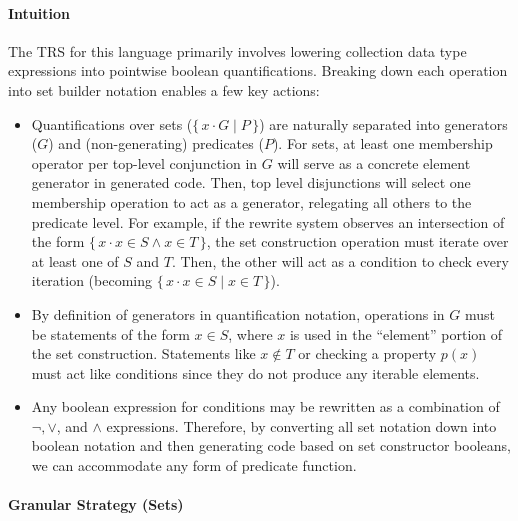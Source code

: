 \documentclass{article}
\newcommand{\bSet}[3]{%
  \{\, #1 \cdot #2 \mid #3 \, \}%
}
\newcommand{\bSetT}[2]{%
  \{\, #1 \cdot #2 \,\}%
}
\begin{document}
\paragraph{Intuition}
The TRS for this language primarily involves lowering collection data type expressions into pointwise boolean quantifications. Breaking down each operation into set builder notation enables a few key actions:
\begin{itemize}
  \item Quantifications over sets ($\bSet{x}{G}{P}$) are naturally separated into generators ($G$) and (non-generating) predicates ($P$). For sets, at least one membership operator per top-level conjunction in $G$ will serve as a concrete element generator in generated code. Then, top level disjunctions will select one membership operation to act as a generator, relegating all others to the predicate level. For example, if the rewrite system observes an intersection of the form $\bSetT{x}{x \in S \land x \in T}$, the set construction operation must iterate over at least one of $S$ and $T$. Then, the other will act as a condition to check every iteration (becoming $\bSet{x}{x \in S}{x \in T}$).
  \item By definition of generators in quantification notation, operations in $G$ must be statements of the form $x \in S$, where $x$ is used in the ``element'' portion of the set construction. Statements like $x \notin T$ or checking a property $p(x)$ must act like conditions since they do not produce any iterable elements.
  \item Any boolean expression for conditions may be rewritten as a combination of $\lnot, \lor$, and $\land$ expressions. Therefore, by converting all set notation down into boolean notation and then generating code based on set constructor booleans, we can accommodate any form of predicate function.
\end{itemize}


\paragraph{Granular Strategy (Sets)}
\end{document}
